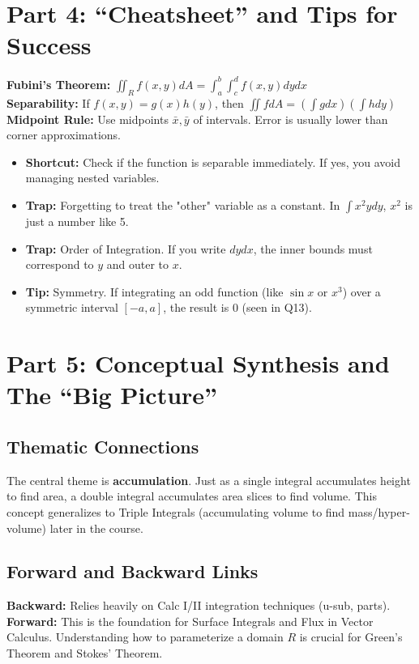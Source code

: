 \documentclass[11pt,a4paper]{article}
\begin{document}
\section{Part 4: ``Cheatsheet'' and Tips for Success}

\begin{tcolorbox}[title=Essential Formulas]
    \textbf{Fubini's Theorem:} $\iint_R f(x,y) dA = \int_a^b \int_c^d f(x,y) dy dx$ \\
    \textbf{Separability:} If $f(x,y) = g(x)h(y)$, then $\iint f dA = (\int g dx)(\int h dy)$ \\
    \textbf{Midpoint Rule:} Use midpoints $\bar{x}, \bar{y}$ of intervals. Error is usually lower than corner approximations.
\end{tcolorbox}

\begin{itemize}
    \item \textbf{Shortcut:} Check if the function is separable immediately. If yes, you avoid managing nested variables.
    \item \textbf{Trap:} Forgetting to treat the "other" variable as a constant. In $\int x^2 y dy$, $x^2$ is just a number like 5.
    \item \textbf{Trap:} Order of Integration. If you write $dy dx$, the inner bounds must correspond to $y$ and outer to $x$.
    \item \textbf{Tip:} Symmetry. If integrating an odd function (like $\sin x$ or $x^3$) over a symmetric interval $[-a, a]$, the result is 0 (seen in Q13).
\end{itemize}

\section{Part 5: Conceptual Synthesis and The ``Big Picture''}
\subsection{Thematic Connections}
The central theme is \textbf{accumulation}. Just as a single integral accumulates height to find area, a double integral accumulates area slices to find volume. This concept generalizes to Triple Integrals (accumulating volume to find mass/hyper-volume) later in the course.

\subsection{Forward and Backward Links}
\textbf{Backward:} Relies heavily on Calc I/II integration techniques (u-sub, parts).
\textbf{Forward:} This is the foundation for Surface Integrals and Flux in Vector Calculus. Understanding how to parameterize a domain $R$ is crucial for Green's Theorem and Stokes' Theorem.
\end{document}
